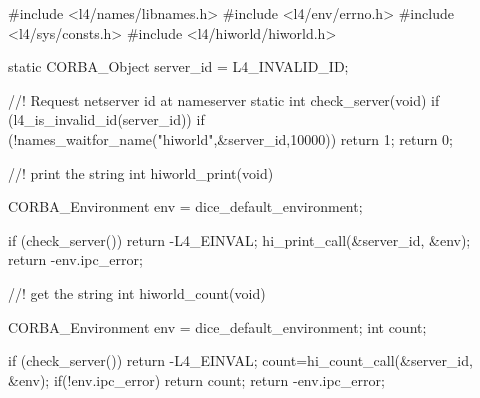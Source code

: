 #include <l4/names/libnames.h>
#include <l4/env/errno.h>
#include <l4/sys/consts.h>
#include <l4/hiworld/hiworld.h>

static CORBA_Object server_id = L4_INVALID_ID;
            
//! Request netserver id at nameserver
static int check_server(void){
    if (l4_is_invalid_id(server_id)){
        if (!names_waitfor_name("hiworld",&server_id,10000)) return 1;
    }
    return 0;
}

//! print the string
int hiworld_print(void){
    CORBA_Environment env = dice_default_environment;

    if (check_server()) return -L4_EINVAL;
    hi_print_call(&server_id, &env);
    return -env.ipc_error;
}

//! get the string
int hiworld_count(void){
    CORBA_Environment env = dice_default_environment;
    int count;

    if (check_server()) return -L4_EINVAL;
    count=hi_count_call(&server_id, &env);
    if(!env.ipc_error) return count;
    return -env.ipc_error;
}
